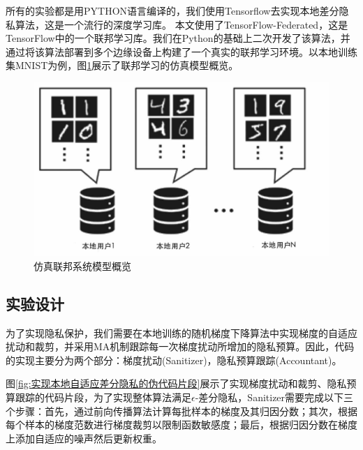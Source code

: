 所有的实验都是用PYTHON语言编译的，我们使用Tensorflow去实现本地差分隐私算法，这是一个流行的深度学习库。 本文使用了TensorFlow-Federated，这是TensorFlow中的一个联邦学习库。我们在Python的基础上二次开发了该算法，并通过将该算法部署到多个边缘设备上构建了一个真实的联邦学习环境。以本地训练集MNIST为例，图\ref{fig:仿真联邦系统模型概览}展示了联邦学习的仿真模型概览。

\begin{figure}[!hbt]
\centering
	\includegraphics[scale=0.3]{fig2/C3/联邦系统仿真模型概览}%
	\caption{仿真联邦系统模型概览}
	\label{fig:仿真联邦系统模型概览}	
\end{figure}

\subsection{实验设计}
为了实现隐私保护，我们需要在本地训练的随机梯度下降算法中实现梯度的自适应扰动和裁剪，并采用MA机制跟踪每一次梯度扰动所增加的隐私预算。因此，代码的实现主要分为两个部分：梯度扰动(Sanitizer)，隐私预算跟踪(Accountant)。

图\ref{fig:实现本地自适应差分隐私的伪代码片段}展示了实现梯度扰动和裁剪、隐私预算跟踪的代码片段，为了实现整体算法满足$\epsilon$-差分隐私，Sanitizer需要完成以下三个步骤：首先，通过前向传播算法计算每批样本的梯度及其归因分数；其次，根据每个样本的梯度范数进行梯度裁剪以限制函数敏感度；最后，根据归因分数在梯度上添加自适应的噪声然后更新权重。

